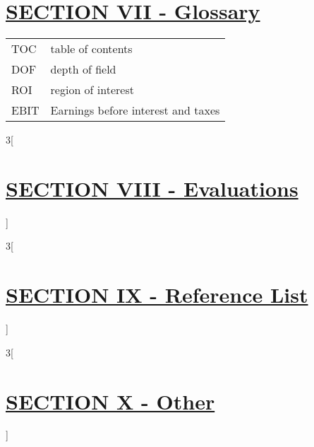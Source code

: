 \documentclass[11pt,a4paper,numbers=noenddot]{scrartcl}
\numberwithin{equation}{section}
\begin{document}
\newpage
\section{\underline{SECTION VII - Glossary}}
\begin{tabularx}{\textwidth}{p{3cm} l}
	TOC & table of contents \\
	DOF & depth of field \\
	ROI & region of interest \\
	EBIT & Earnings before interest and taxes
\end{tabularx}	
	
\newpage
\begin{paracol}{3}[\section{\underline{SECTION VIII - Evaluations}}]
	
\end{paracol}

\newpage
\begin{paracol}{3}[\section{\underline{SECTION IX - Reference List}}]
	
\end{paracol}

\newpage
\begin{paracol}{3}[\section{\underline{SECTION X - Other}}]
	
\end{paracol}
\end{document}
